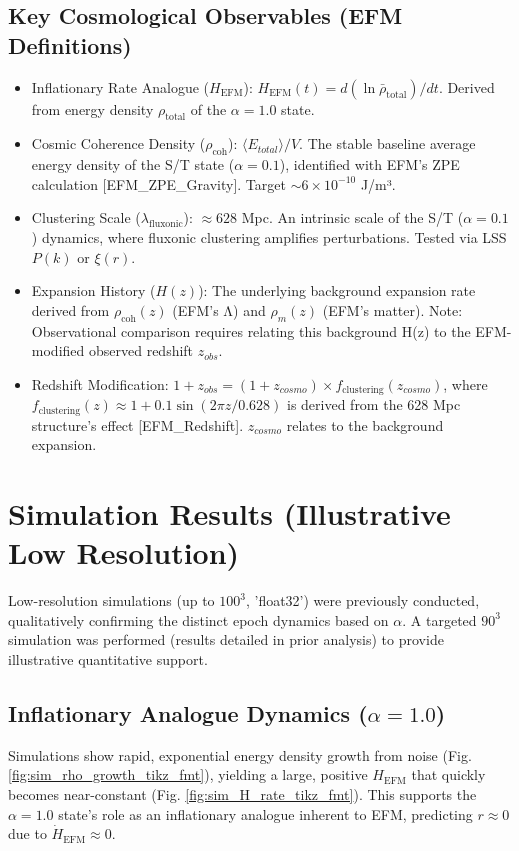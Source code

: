 \documentclass[11pt]{article}
\begin{document}
\subsection{Key Cosmological Observables (EFM Definitions)}
\begin{itemize}
    \item Inflationary Rate Analogue (\(H_{\text{EFM}}\)): \( H_{\text{EFM}}(t) = d (\ln \bar{\rho}_{\text{total}})/dt \). Derived from energy density \(\rho_{\text{total}}\) of the \(\alpha=1.0\) state.
    \item Cosmic Coherence Density (\(\rho_{\text{coh}}\)): \( \langle E_{total} \rangle / V \). The stable baseline average energy density of the S/T state (\(\alpha=0.1\)), identified with EFM's ZPE calculation [EFM\_ZPE\_Gravity]. Target \(\sim 6 \times 10^{-10}\) J/m³.
    \item Clustering Scale (\(\lambda_{\text{fluxonic}}\)): \(\approx 628\) Mpc. An intrinsic scale of the S/T (\(\alpha=0.1\)) dynamics, where fluxonic clustering amplifies perturbations. Tested via LSS \(P(k)\) or \(\xi(r)\).
    \item Expansion History (\(H(z)\)): The underlying background expansion rate derived from \(\rho_{\text{coh}}(z)\) (EFM's Λ) and \(\rho_m(z)\) (EFM's matter). Note: Observational comparison requires relating this background H(z) to the EFM-modified observed redshift \(z_{obs}\).
    \item Redshift Modification: \(1 + z_{obs} = (1 + z_{cosmo}) \times f_{\text{clustering}}(z_{cosmo})\), where \(f_{\text{clustering}}(z) \approx 1 + 0.1\sin(2\pi z / 0.628)\) is derived from the 628 Mpc structure's effect [EFM\_Redshift]. \(z_{cosmo}\) relates to the background expansion.
\end{itemize}

\section{Simulation Results (Illustrative Low Resolution)}
Low-resolution simulations (up to \(100^3\), 'float32') were previously conducted, qualitatively confirming the distinct epoch dynamics based on \(\alpha\). A targeted \(90^3\) simulation was performed (results detailed in prior analysis) to provide illustrative quantitative support.

\subsection{Inflationary Analogue Dynamics (\(\alpha=1.0\))}
Simulations show rapid, exponential energy density growth from noise (Fig. \ref{fig:sim_rho_growth_tikz_fmt}), yielding a large, positive \(H_{\text{EFM}}\) that quickly becomes near-constant (Fig. \ref{fig:sim_H_rate_tikz_fmt}). This supports the \(\alpha=1.0\) state's role as an inflationary analogue inherent to EFM, predicting \(r \approx 0\) due to \( \dot{H}_{\text{EFM}} \approx 0\).
\end{document}

